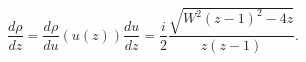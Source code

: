 \begin{equation}
 \frac{d \rho}{dz} = \frac{d \rho}{d u} (u(z)) \frac{d u}{dz}  =
  \frac{i}{2}\frac{\sqrt{W^2(z-1)^2-4z}}{z(z-1)}.
\end{equation}

